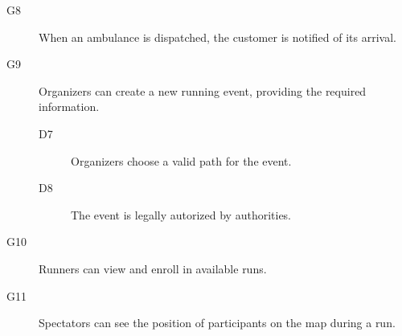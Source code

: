 \documentclass[../main.tex]{subfiles}
\begin{document}
\begin{description}
	\item [G8]  When an ambulance is dispatched, the customer is notified of its arrival.
	\begin{description}
		\item
	\end{description}

	\item [G9]  Organizers can create a new running event, providing the required information.
	\begin{description}
		\item [D7] Organizers choose a valid path for the event.
		\item [D8] The event is legally autorized by authorities.
	\end{description}

	\item [G10]  Runners can view and enroll in available runs.
	\begin{description}
		\item []
	\end{description}

	\item [G11] Spectators can see the position of participants on the map during a run.
	\begin{description}
		\item
	\end{description}
\end{description}
\end{document}

